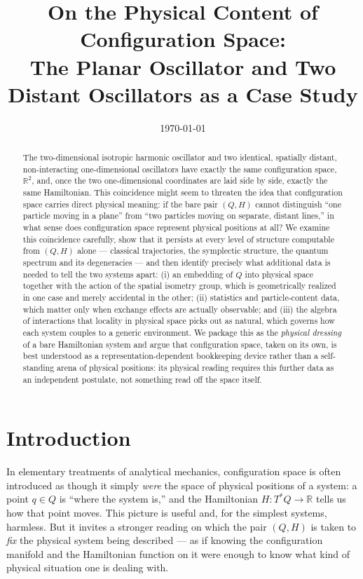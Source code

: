 \documentclass[11pt]{article}
\title{On the Physical Content of Configuration Space:\\
The Planar Oscillator and Two Distant Oscillators as a Case Study}
\author{}
\date{\today}
\begin{document}
\maketitle

\begin{abstract}
\noindent
The two-dimensional isotropic harmonic oscillator and two identical, spatially distant, non-interacting one-dimensional oscillators have exactly the same configuration space, $\mathbb{R}^2$, and, once the two one-dimensional coordinates are laid side by side, exactly the same Hamiltonian. This coincidence might seem to threaten the idea that configuration space carries direct physical meaning: if the bare pair $(Q,H)$ cannot distinguish ``one particle moving in a plane'' from ``two particles moving on separate, distant lines,'' in what sense does configuration space represent physical positions at all? We examine this coincidence carefully, show that it persists at every level of structure computable from $(Q,H)$ alone --- classical trajectories, the symplectic structure, the quantum spectrum and its degeneracies --- and then identify precisely what additional data is needed to tell the two systems apart: (i) an embedding of $Q$ into physical space together with the action of the spatial isometry group, which is geometrically realized in one case and merely accidental in the other; (ii) statistics and particle-content data, which matter only when exchange effects are actually observable; and (iii) the algebra of interactions that locality in physical space picks out as natural, which governs how each system couples to a generic environment. We package this as the \emph{physical dressing} of a bare Hamiltonian system and argue that configuration space, taken on its own, is best understood as a representation-dependent bookkeeping device rather than a self-standing arena of physical positions: its physical reading requires this further data as an independent postulate, not something read off the space itself.
\end{abstract}

\section{Introduction}

In elementary treatments of analytical mechanics, configuration space is often introduced as though it simply \emph{were} the space of physical positions of a system: a point $q\in Q$ is ``where the system is,'' and the Hamiltonian $H:T^*Q\to\mathbb{R}$ tells us how that point moves. This picture is useful and, for the simplest systems, harmless. But it invites a stronger reading on which the pair $(Q,H)$ is taken to \emph{fix} the physical system being described --- as if knowing the configuration manifold and the Hamiltonian function on it were enough to know what kind of physical situation one is dealing with.
\end{document}
